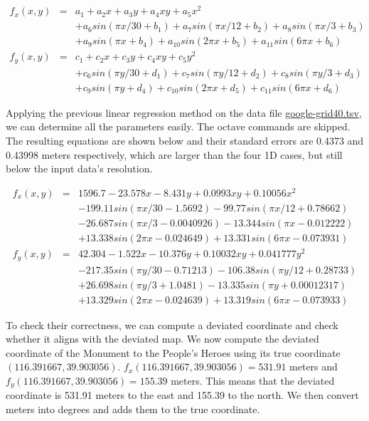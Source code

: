 \documentclass[a4paper]{article}
\begin{document}
\begin{eqnarray}
\label{eq:fxp}
f_x(x,y) &=& a_1+a_2x+a_3y+a_4xy+a_5x^2 \nonumber \\
         & & +a_6sin(\pi x/30+b_1) +a_7sin(\pi x/12+b_2)+a_8sin(\pi x/3+b_3) \nonumber \\
         & & +a_9sin(\pi x+b_4)+a_{10}sin(2\pi x +b_5) +a_{11}sin(6\pi x+b_6) \\
\label{eq:fyp}
f_y(x,y) &=& c_1 +c_2x +c_3y +c_4xy +c_5y^2 \nonumber \\
         & & +c_6sin(\pi y/30+d_1)+c_7sin(\pi y/12 +d_2)+c_8sin(\pi y/3+d_3) \nonumber \\
         & & +c_9sin(\pi y+d_4)+c_{10}sin(2\pi x+d_5) +c_{11}sin(6\pi x +d_6)
\end{eqnarray}

Applying the previous linear regression method on the data file
\url{google-grid40.tsv}, we can determine all the parameters easily.
The octave commands are skipped.
The resulting equations are shown below and their standard errors are 0.4373
and 0.43998 meters respectively, which are larger than the
four 1D cases, but still below the input data's resolution.

\begin{eqnarray}
f_x(x,y) &=& 1596.7-23.578x -8.431y +0.0993xy +0.10056x^2 \nonumber \\
          & & -199.11sin(\pi x/30-1.5692) -99.77sin(\pi x/12+0.78662) \nonumber \\
          & & -26.687sin(\pi x/3-0.0040926) -13.344sin(\pi x-0.012222) \nonumber \\
          & & +13.338sin(2\pi x -0.024649) +13.331sin(6\pi x-0.073931) \\
f_y(x,y) &=& 42.304 -1.522x -10.376y +0.10032xy +0.041777y^2 \nonumber \\
         & & -217.35sin(\pi y/30 -0.71213)-106.38sin(\pi y/12 +0.28733) \nonumber \\
         & & +26.698sin(\pi y/3+1.0481) -13.335sin(\pi y+0.00012317) \nonumber \\
         & & +13.329sin(2\pi x-0.024639) +13.319sin(6\pi x -0.073933)
\end{eqnarray}

To check their correctness, we can compute a deviated coordinate and check
whether it aligns with the deviated map.
We now compute the deviated coordinate of the Monument to the People's Heroes
using its true coordinate $(116.391667,39.903056)$.
$f_x(116.391667,39.903056)=531.91$ meters and
$f_y(116.391667,39.903056)=155.39$ meters.
This means that the deviated coordinate is 531.91 meters to the east and 155.39
to the north.
We then convert meters into degrees and adds them to the true coordinate.
\end{document}
